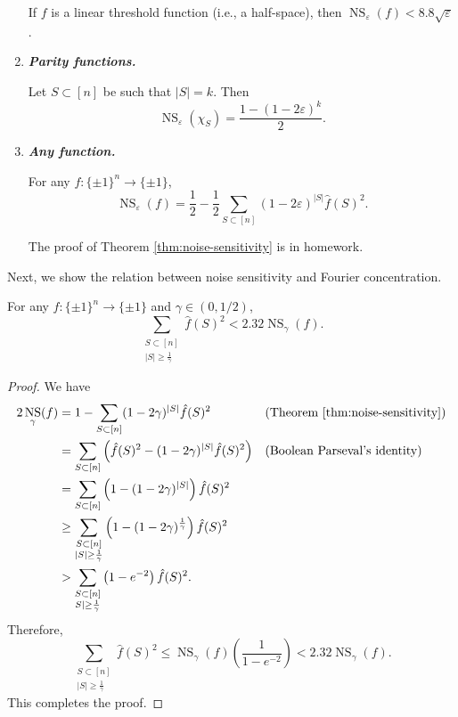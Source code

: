 \documentclass[letterpaper, reqno,11pt]{article}
\DeclareMathOperator{\NS}{NS}
\begin{document}
\begin{enumerate}[label=(\roman*)]
  \begin{theorem}
    If $f$ is a linear threshold function (i.e., a half-space), then $\NS_\varepsilon(f) < 8.8 \sqrt{\varepsilon}$.
  \end{theorem}
  \item {\bf \em Parity functions.}
  
  \begin{proposition}
    Let $S \subset [n]$ be such that $|S| = k$. Then
    $$ \NS_\varepsilon\left(\chi_S\right) = \frac{1 - (1 - 2\varepsilon)^k}{2}. $$
  \end{proposition}

  \item {\bf \em Any function.}
  
  \begin{theorem} \label{thm:noise-sensitivity}
    For any $f : \{ \pm 1 \}^n \to \{ \pm 1 \}$,
    $$ \NS_\varepsilon(f) = \frac{1}{2} - \frac{1}{2} \sum_{S \subset [n]} (1 - 2\varepsilon)^{|S|} \hat{f}(S)^2. $$
  \end{theorem}
  
  The proof of Theorem \ref{thm:noise-sensitivity} is in homework.
\end{enumerate}

Next, we show the relation between noise sensitivity and Fourier concentration.

\begin{theorem} \label{thm:noise-fourier}
  For any $f : \{ \pm 1 \}^n \to \{ \pm 1 \}$ and $\gamma \in (0, 1/2)$,
  $$ \sum_{\substack{S \subset [n] \\ |S| \geq \frac{1}{\gamma}}} \hat{f}(S)^2 < 2.32 \NS_\gamma(f). $$
\end{theorem}

\begin{proof}
  We have
  \begin{align*}
    2\NS_\gamma(f) &= 1 - \sum_{S \subset [n]} (1 - 2\gamma)^{|S|} \hat{f}(S)^2 && \text{(Theorem \ref{thm:noise-sensitivity})} \\
    &= \sum_{S \subset [n]} \left(\hat{f}(S)^2 - (1 - 2\gamma)^{|S|} \hat{f}(S)^2\right) && \text{(Boolean Parseval's identity)} \\
    &= \sum_{S \subset [n]} \left(1 - (1 - 2\gamma)^{|S|}\right) \hat{f}(S)^2 \\
    &\geq \sum_{\substack{S \subset [n] \\ |S| \geq \frac{1}{\gamma}}} \left(1 - (1 - 2\gamma)^\frac{1}{\gamma}\right) \hat{f}(S)^2 \\
    &> \sum_{\substack{S \subset [n] \\ S| \geq \frac{1}{\gamma}}} \left(1 - e^{-2}\right) \hat{f}(S)^2.
  \end{align*}
  Therefore,
  $$ \sum_{\substack{S \subset [n] \\ |S| \geq \frac{1}{\gamma}}} \hat{f}(S)^2 \leq \NS_\gamma(f) \left(\frac{1}{1 - e^{-2}}\right) < 2.32 \NS_\gamma(f). $$
  This completes the proof.
\end{proof}
\end{document}
